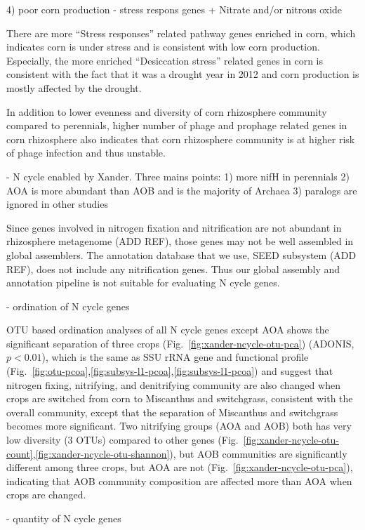 \documentclass[12pt]{article}
\begin{document}
4) poor corn production - stress respons genes + Nitrate and/or nitrous oxide

There are more ``Stress responses'' related pathway genes enriched in corn, which indicates corn is under stress and is consistent with low corn production. Especially, the more enriched ``Desiccation stress'' related genes in corn is consistent with the fact that it was a drought year in 2012 and corn production is mostly affected by the drought. 

In addition to lower evenness and diversity of corn rhizosphere community compared to perennials, higher number of phage and prophage related genes in corn rhizosphere also indicates that corn rhizosphere community is at higher risk of phage infection and thus unstable.

- N cycle enabled by Xander. Three mains points: 1) more nifH in perennials 2) AOA is more abundant than AOB and is the majority of Archaea 3) paralogs are ignored in other studies

Since genes involved in nitrogen fixation and nitrification are not abundant in rhizosphere metagenome (ADD REF), those genes may not be well assembled in global assemblers. The annotation database that we use, SEED subsystem (ADD REF), does not include any nitrification genes. Thus our global assembly and annotation pipeline is not suitable for evaluating N cycle genes.

- ordination of N cycle genes

OTU based ordination analyses of all N cycle genes except AOA shows the significant separation of three crops (Fig.~\ref{fig:xander-ncycle-otu-pca}) (ADONIS, $p < 0.01$), which is the same as SSU rRNA gene and functional profile (Fig.~\ref{fig:otu-pcoa},\ref{fig:subsys-l1-pcoa},\ref{fig:subsys-l1-pcoa}) and suggest that nitrogen fixing, nitrifying, and denitrifying community are also changed when crops are switched from corn to Miscanthus and switchgrass, consistent with the overall community, except that the separation of Miscanthus and switchgrass becomes more significant. Two nitrifying groups (AOA and AOB) both has very low diversity (3 OTUs) compared to other genes (Fig.~\ref{fig:xander-ncycle-otu-count},\ref{fig:xander-ncycle-otu-shannon}), but AOB communities are significantly different among three crops, but AOA are not (Fig.~\ref{fig:xander-ncycle-otu-pca}), indicating that AOB community composition are affected more than AOA when crops are changed.

- quantity of N cycle genes
\end{document}

